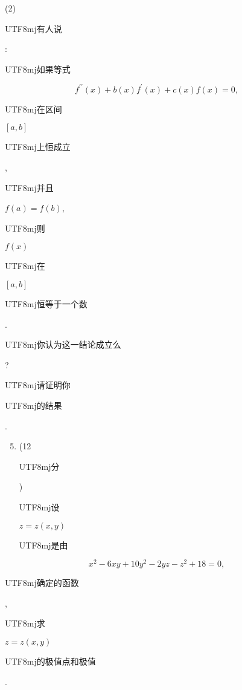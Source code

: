 \documentclass[10pt]{article}
\begin{document}
(2) \begin{CJK}{UTF8}{mj}有人说\end{CJK}: \begin{CJK}{UTF8}{mj}如果等式\end{CJK}
$$
f^{\prime \prime}(x)+b(x) f^{\prime}(x)+c(x) f(x)=0,
$$
\begin{CJK}{UTF8}{mj}在区间\end{CJK} $[a, b]$ \begin{CJK}{UTF8}{mj}上恒成立\end{CJK}, \begin{CJK}{UTF8}{mj}并且\end{CJK} $f(a)=f(b)$, \begin{CJK}{UTF8}{mj}则\end{CJK} $f(x)$ \begin{CJK}{UTF8}{mj}在\end{CJK} $[a, b]$ \begin{CJK}{UTF8}{mj}恒等于一个数\end{CJK}. \begin{CJK}{UTF8}{mj}你认为这一结论成立么\end{CJK}? \begin{CJK}{UTF8}{mj}请证明你\end{CJK} \begin{CJK}{UTF8}{mj}的结果\end{CJK}.

\begin{enumerate}
  \setcounter{enumi}{4}
  \item (12 \begin{CJK}{UTF8}{mj}分\end{CJK}) \begin{CJK}{UTF8}{mj}设\end{CJK} $z=z(x, y)$ \begin{CJK}{UTF8}{mj}是由\end{CJK}
\end{enumerate}
$$
x^{2}-6 x y+10 y^{2}-2 y z-z^{2}+18=0,
$$
\begin{CJK}{UTF8}{mj}确定的函数\end{CJK}, \begin{CJK}{UTF8}{mj}求\end{CJK} $z=z(x, y)$ \begin{CJK}{UTF8}{mj}的极值点和极值\end{CJK}.
\end{document}
